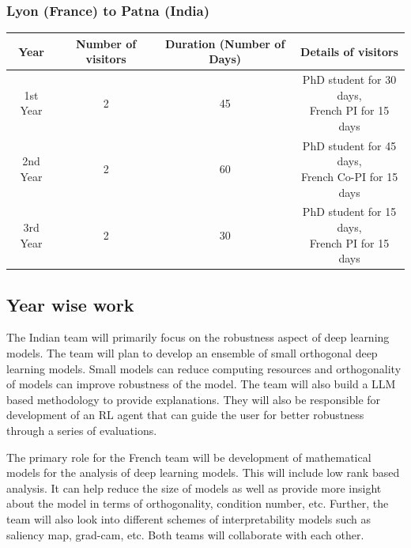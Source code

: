 \documentclass[a4paper,11pt]{article}
\begin{document}
\subsubsection*{Lyon (France) to Patna (India)}

\begin{center}
	\begin{tabular}{|c|c|c|c|}
		\hline
		\textbf{Year} & \textbf{Number of visitors} & \textbf{Duration (Number of Days)} & \textbf{Details of visitors}\\ \hline
		1st Year & 2 & 45 & \makecell{PhD student for 30 days,\\ French PI for 15 days}\\ \hline
		2nd Year & 2 & 60 & \makecell{PhD student for 45 days,\\ French Co-PI for 15 days}\\ \hline
		3rd Year & 2 & 30 & \makecell{PhD student for 15 days,\\ French PI for 15 days}\\ \hline
	\end{tabular}
\end{center}

\subsection{Year wise work}
The Indian team will primarily focus on the robustness aspect of deep learning models. The team will plan to develop an ensemble of small orthogonal deep learning models. Small models can reduce computing resources and orthogonality of models can improve robustness of the model. The team will also build a LLM based methodology to provide explanations. They will also be responsible for development of an RL agent that can guide the user for better robustness through a series of evaluations. 


The primary role for the French team will be development of mathematical models for the analysis of deep learning models. This will include low rank based analysis. It can help reduce the size of models as well as provide more insight about the model in terms of orthogonality, condition number, etc. Further, the team will also look into different schemes of interpretability models such as saliency map, grad-cam, etc. Both teams will collaborate with each other.
\end{document}
